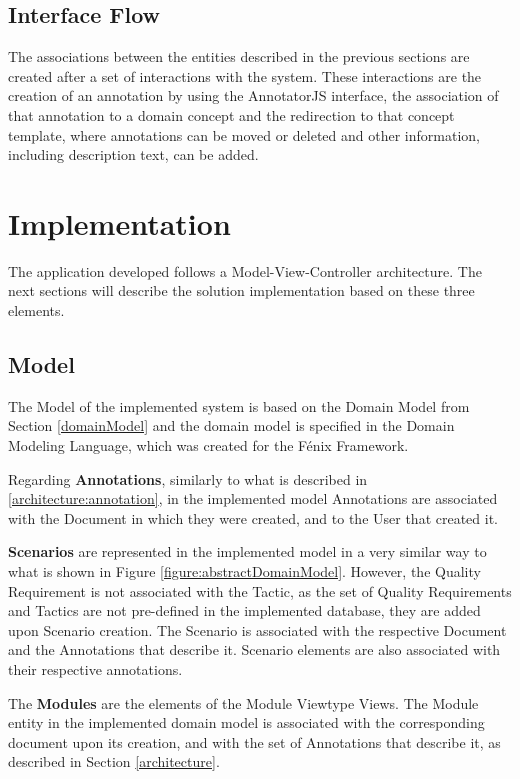 \documentclass{llncs}
\begin{document}
\subsection{Interface Flow}
\label{section:interfaceFlow}

The associations between the entities described in the previous sections are created after a set of interactions with the system. These interactions are the creation of an annotation by using the AnnotatorJS interface, the association of that annotation to a domain concept and the redirection to that concept template, where annotations can be moved or deleted and other information, including description text, can be added.

\section{Implementation}
\label{implementation}
The application developed follows a Model-View-Controller architecture. The next sections will describe the solution implementation based on these three elements.

\subsection{Model}
\label{implementation:model}
The Model of the implemented system is based on the Domain Model from Section \ref{domainModel} and the domain model is specified in the Domain Modeling Language, which was created for the F\'{e}nix Framework\cite{cachopo2006combining,cachopo2007development}.

Regarding \textbf{Annotations}, similarly to what is described in \ref{architecture:annotation}, in the implemented model Annotations are associated with the Document in which they were created, and to the User that created it.

\textbf{Scenarios} are represented in the implemented model in a very similar way to what is shown in Figure \ref{figure:abstractDomainModel}. However, the Quality Requirement is not associated with the Tactic, as the set of Quality Requirements and Tactics are not pre-defined in the implemented database, they are added upon Scenario creation. The Scenario is associated with the respective Document and the Annotations that describe it. Scenario elements are also associated with their respective annotations.

The \textbf{Modules} are the elements of the Module Viewtype Views. The Module entity in the implemented domain model is associated with the corresponding document upon its creation, and with the set of Annotations that describe it, as described in Section \ref{architecture}.
\end{document}
